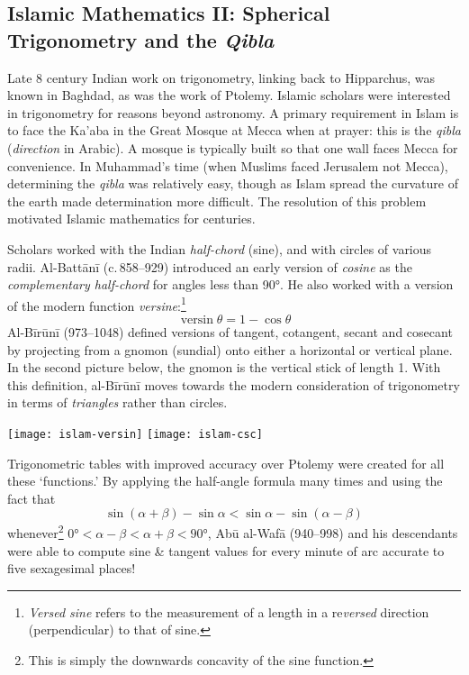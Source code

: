 \clearpage



\subsection{Islamic Mathematics II: Spherical Trigonometry and the \emph{Qibla}}

Late 8\th{} century Indian work on trigonometry, linking back to Hipparchus, was known in Baghdad, as was the work of Ptolemy. Islamic scholars were interested in trigonometry for reasons beyond astronomy. A primary requirement in Islam is to face the Ka'aba in the Great Mosque at Mecca when at prayer: this is the \emph{qibla} (\emph{direction} in Arabic). A mosque is typically built so that one wall faces Mecca for convenience. In Muhammad's time (when Muslims faced Jerusalem not Mecca), determining the \emph{qibla} was relatively easy, though as Islam spread the curvature of the earth made determination more difficult. The resolution of this problem motivated Islamic mathematics for centuries.




Scholars worked with the Indian \emph{half-chord} (sine), and with circles of various radii. Al-Battānī (c.\,858--929) introduced an early version of \emph{cosine} as the \emph{complementary half-chord} for angles less than \ang{90}. He also worked with a version of the modern function \emph{versine}:\footnote{\emph{Versed sine} refers to the measurement of a length in a re\emph{versed} direction (perpendicular) to that of sine.}
\[
	\operatorname{versin}\theta=1-\cos\theta
\]
Al-Bīrūnī (973--1048) defined versions of tangent, cotangent, secant and cosecant by projecting from a gnomon (sundial) onto either a horizontal or vertical plane. In the second picture below, the gnomon is the vertical stick of length 1. With this definition, al-Bīrūnī moves towards the modern consideration of trigonometry in terms of \emph{triangles} rather than circles.
\begin{center}
  \texttt{[image: islam-versin]}\qquad\qquad
  \texttt{[image: islam-csc]}
\end{center}\label{pg:sineconcave}

Trigonometric tables with improved accuracy over Ptolemy were created for all these `functions.' By applying the half-angle formula many times and using the fact that
\[
	\sin(\alpha+\beta)-\sin\alpha<\sin\alpha-\sin(\alpha-\beta)
\]
whenever\footnote{This is simply the downwards concavity of the sine function.} $\ang{0}<\alpha-\beta<\alpha+\beta<\ang{90}$, Abū al-Wafā (940--998) and his descendants were able to compute sine \& tangent values for every minute of arc accurate to five sexagesimal places!
\goodbreak


